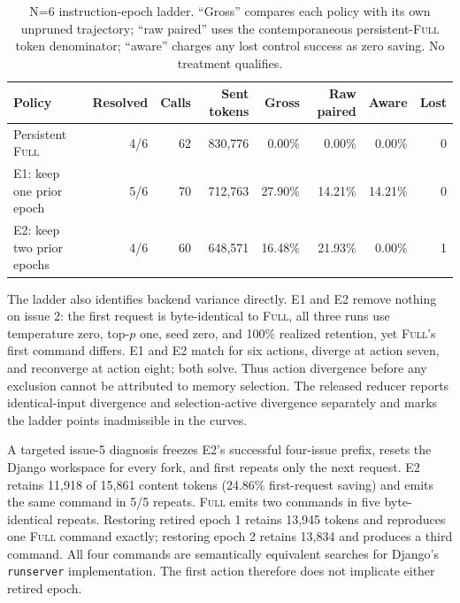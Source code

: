 \documentclass[11pt]{article}
\begin{document}
\begin{table}[H]
\centering
\scriptsize
\caption{N=6 instruction-epoch ladder. ``Gross'' compares each policy with
its own unpruned trajectory; ``raw paired'' uses the contemporaneous
persistent-\textsc{Full} token denominator; ``aware'' charges any lost control
success as zero saving.  No treatment qualifies.}
\label{tab:instruction-epoch-n6-ladder}
\begin{tabular}{lrrrrrrr}
\toprule
Policy & Resolved & Calls & Sent tokens & Gross & Raw paired & Aware & Lost \\
\midrule
Persistent \textsc{Full} & 4/6 & 62 & 830,776 & 0.00\% & 0.00\% & 0.00\% & 0 \\
E1: keep one prior epoch & 5/6 & 70 & 712,763 & 27.90\% & 14.21\% & 14.21\% & 0 \\
E2: keep two prior epochs & 4/6 & 60 & 648,571 & 16.48\% & 21.93\% & 0.00\% & 1 \\
\bottomrule
\end{tabular}
\end{table}

The ladder also identifies backend variance directly.  E1 and E2 remove
nothing on issue 2: the first request is byte-identical to \textsc{Full}, all
three runs use temperature zero, top-$p$ one, seed zero, and 100\% realized
retention, yet \textsc{Full}'s first command differs.  E1 and E2 match for six
actions, diverge at action seven, and reconverge at action eight; both solve.
Thus action divergence before any exclusion cannot be attributed to memory
selection.  The released reducer reports identical-input divergence and
selection-active divergence separately and marks the ladder points
inadmissible in the curves.

A targeted issue-5 diagnosis freezes E2's successful four-issue prefix, resets
the Django workspace for every fork, and first repeats only the next request.
E2 retains 11,918 of 15,861 content tokens (24.86\% first-request saving) and
emits the same command in 5/5 repeats.  \textsc{Full} emits two commands in
five byte-identical repeats.  Restoring retired epoch 1 retains 13,945 tokens
and reproduces one \textsc{Full} command exactly; restoring epoch 2 retains
13,834 and produces a third command.  All four commands are semantically
equivalent searches for Django's \texttt{runserver} implementation.  The
first action therefore does not implicate either retired epoch.
\end{document}
